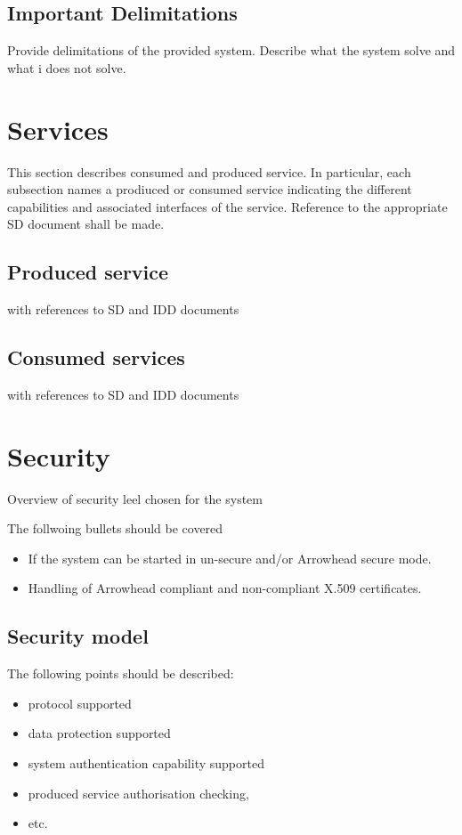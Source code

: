 \message{ !name(GSoSD_foundational principle developments.tex)}\documentclass[a4paper]{arrowhead}
\begin{document}
\subsection{Important Delimitations}
\label{sec:delimitations}

\color{red}
Provide delimitations of the provided system. Describe what the system
solve and what i does not solve.
\color{black}  



\newpage

\section{Services}
\label{sec:services}

\color{red}
This section describes consumed and produced service.
In particular, each subsection names a prodiuced or consumed service
indicating the different capabilities and associated interfaces of the
service. Reference to the appropriate SD document shall be made.

\subsection{Produced service}
with references to SD and IDD documents

\subsection{Consumed services}
with references to SD and IDD documents

\color{black}




\newpage

\section{Security}
\label{sec:security}


\color{red}
Overview of security leel chosen for the system

The follwoing bullets should be covered 
\begin{itemize}
\item  If the system can be started in un-secure and/or
Arrowhead secure mode.
\item Handling of Arrowhead compliant and
non-compliant X.509 certificates.
\end{itemize}

\subsection {Security model}
The following points should be described:
\begin{itemize}
\item protocol supported 
\item data protection supported 
\item system authentication capability supported
\item produced service authorisation checking, 
\item etc.
\end{itemize}
\end{document}
